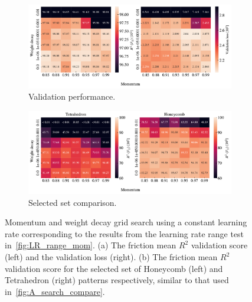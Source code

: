 


\begin{figure}[H]
  \centering
  \begin{subfigure}[t]{\textwidth}
      \centering
      \includegraphics[width=1\textwidth]{figures/ML/mom_weight_search_constant_perf.pdf}
      \caption{Validation performance.}
  \end{subfigure}
  \hfill
  \begin{subfigure}[t]{\textwidth}
      \centering
      \includegraphics[width=1\textwidth]{figures/ML/mom_weight_search_compare_constant_perf.pdf}
      \caption{Selected set comparison.}
  \end{subfigure}
  \hfill
  \caption{Momentum and weight decay grid search using a constant learning rate corresponding to the results from the learning rate range test in~\cref{fig:LR_range_mom}. (a) The friction mean $R^2$ validation score (left) and the validation loss (right). (b) The friction mean $R^2$ validation score for the selected set of Honeycomb (left) and Tetrahedron (right) patterns respectively, similar to that used in~\cref{fig:A_search_compare}.}
  \label{fig:mom_weight_search_constant}
\end{figure}

